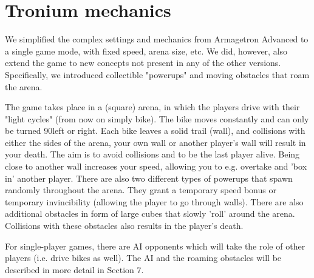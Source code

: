 \documentclass{report}
\begin{document}
 
 \section{Tronium mechanics }
We simplified the complex settings and mechanics from Armagetron Advanced to a single game mode, with fixed speed, arena size, etc.
We did, however, also extend the game to new concepts not present in any of the other versions. Specifically, we introduced collectible "powerups" and moving obstacles that roam the arena.

The game takes place in a (square) arena, in which the players drive with their "light cycles" (from now on simply bike).
The bike moves constantly and can only be turned 90\textdegree left or right.
Each bike leaves a solid trail (wall), and collisions with either the sides of the arena, your own wall or another player's wall will result in your death.
The aim is to avoid collisions and to be the last player alive.
Being close to another wall increases your speed, allowing you to e.g. overtake and 'box in' another player.
There are also two different types of powerups that spawn randomly throughout the arena. 
They grant a temporary speed bonus or temporary invincibility (allowing the player to go through walls).
There are also additional obstacles in form of large cubes that slowly 'roll' around the arena. Collisions with these obstacles also results in the player's death. 

For single-player games, there are AI opponents which will take the role of other players (i.e. drive bikes as well).
The AI and the roaming obstacles will be described in more detail in Section 7.
\end{document}
